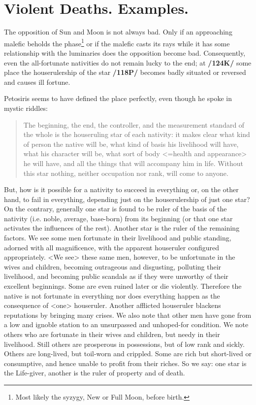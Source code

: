\section{Violent Deaths. Examples.}

The opposition of Sun and Moon is not always bad. Only if an approaching malefic beholds the phase\footnote{Most likely the syzygy, New or Full Moon, before birth.} or if the malefic casts its rays while it has some relationship with the luminaries does the opposition become bad. Consequently, even the all-fortunate nativities do not remain lucky to the end; at \textbf{/124K/} some place the houserulership of the star \textbf{/118P/} becomes badly situated or reversed and causes ill fortune.

Petosiris seems to have defined the place perfectly, even though he spoke in mystic riddles: \begin{quote}The
beginning, the end, the controller, and the measurement standard of the whole is the houseruling star of
each nativity: it makes clear what kind of person the native will be, what kind of basis his livelihood will have, what his character will be, what sort of body <=health and appearance> he will have, and all the things that will accompany him in life. Without this star nothing, neither occupation nor rank, will come to anyone.\end{quote}

But, how is it possible for a nativity to succeed in everything or, on the other hand, to fail in everything, depending just on the houserulership of just one star? On the contrary, generally one star is found to be ruler of the basis of the nativity (i.e. noble, average, base-born) from its beginning (or that one star activates the influences of the rest). Another star is the ruler of the remaining factors. We see some men fortunate in their livelihood and public standing, adorned with all magnificence, with the apparent houseruler configured appropriately. <We see> these same men, however, to be unfortunate in the wives
and children, becoming outrageous and disgusting, polluting their livelihood, and becoming public scandals as if they were unworthy of their excellent beginnings. Some are even ruined later or die violently. Therefore the native is not fortunate in everything nor does everything happen as the consequence of <one> houseruler. Another afflicted houseruler blackens reputations by bringing many crises. We also note that other men have gone from a low and ignoble station to an unsurpassed and unhoped-for condition. We note others who are fortunate in their wives and children, but needy in their livelihood. Still others are prosperous in possessions, but of low rank and sickly. Others are long-lived, but toil-worn and crippled. Some are rich but short-lived or consumptive, and hence unable to profit from their riches. So we say: one star is the Life-giver, another is the ruler of property and of death.

